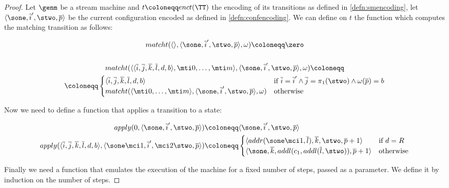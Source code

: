 \begin{proof}

Let $\genm$ be a stream machine and $t\coloneqq enct(\TT)$ the encoding of its transitions as defined in \ref{defn:smencoding}, let $\langle \sone, \overline i', \stwo, \overline p\rangle$ be the current configuration encoded as defined in \ref{defn:confencoding}. We can define on $t$ the function which computes the matching transition as follows:

\begin{align*}
\begin{gathered}
matcht(\langle \rangle, \langle \sone, \overline i', \stwo, \overline p\rangle, \omega)\coloneqq  \zero\\\\
matcht(\langle \langle \overline i, \overline j, \overline k, \overline l, d, b\rangle, \mti 0, \ldots,\mti m \rangle, \langle \sone, \overline i', \stwo, \overline p\rangle, \omega)\coloneqq\\\coloneqq \begin{cases} \langle \overline i, \overline j, \overline k, \overline l, d, b\rangle & \text{if } \overline i = \overline i' \land \overline  j = \pi_1 (\stwo) \land \omega(\overline p)=b\\
matcht(\langle \mti 0, \ldots,\mti m \rangle,  \langle \sone, \overline i', \stwo, \overline p\rangle, \omega)& \text{otherwise}
\end{cases}
\end{gathered}
\end{align*}

Now we need to define a function that applies a transition to a state:

\begin{align*}
apply(0, \langle \sone, \overline i', \stwo, \overline p\rangle)&\coloneqq \langle \sone, \overline i', \stwo, \overline p\rangle\\
apply(\langle \overline i, \overline j, \overline k, \overline l, d, b\rangle, \langle \sone\mci 1, \overline i', \mci 2\stwo, \overline p\rangle)&\coloneqq\begin{cases} \langle addr(\sone\mci1, \overline l), \overline k, \stwo, \overline p+1\rangle & \text{if } d=R\\
\langle \sone, \overline k, addl(c_1, addl(\overline l,\stwo)), \overline p+1\rangle & \text{otherwise}
\end{cases}
\end{align*}

Finally we need a function that emulates the execution of the machine for a fixed number of steps, passed as a parameter. We define it by induction on the number of steps.


\end{proof}
